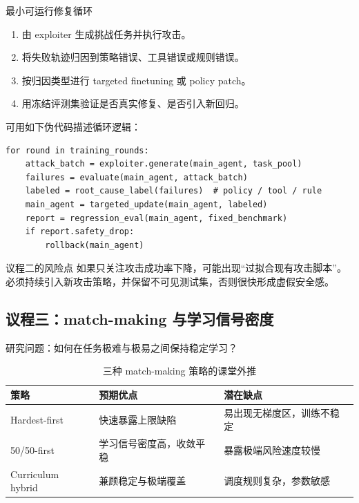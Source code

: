 \documentclass[a4paper]{article}
\begin{document}
\begin{importantbox}{最小可运行修复循环}
\begin{enumerate}
    \item 由 exploiter 生成挑战任务并执行攻击。
    \item 将失败轨迹归因到策略错误、工具错误或规则错误。
    \item 按归因类型进行 targeted finetuning 或 policy patch。
    \item 用冻结评测集验证是否真实修复、是否引入新回归。
\end{enumerate}
\end{importantbox}

可用如下伪代码描述循环逻辑：
\begin{lstlisting}[caption={Auto-Exploit to Auto-Repair 循环（示意）}]
for round in training_rounds:
    attack_batch = exploiter.generate(main_agent, task_pool)
    failures = evaluate(main_agent, attack_batch)
    labeled = root_cause_label(failures)  # policy / tool / rule
    main_agent = targeted_update(main_agent, labeled)
    report = regression_eval(main_agent, fixed_benchmark)
    if report.safety_drop:
        rollback(main_agent)
\end{lstlisting}

\begin{warningbox}{议程二的风险点}
如果只关注攻击成功率下降，可能出现``过拟合现有攻击脚本''。必须持续引入新攻击策略，并保留不可见测试集，否则很快形成虚假安全感。
\end{warningbox}

\subsection{议程三：match-making 与学习信号密度}
研究问题：如何在任务极难与极易之间保持稳定学习？

\begin{table}[H]
\centering
\caption{三种 match-making 策略的课堂外推}
\begin{tabular}{p{3.0cm}p{4.0cm}p{5.6cm}}
\toprule
策略 & 预期优点 & 潜在缺点 \\
\midrule
Hardest-first & 快速暴露上限缺陷 & 易出现无梯度区，训练不稳定 \\
50/50-first & 学习信号密度高，收敛平稳 & 暴露极端风险速度较慢 \\
Curriculum hybrid & 兼顾稳定与极端覆盖 & 调度规则复杂，参数敏感 \\
\bottomrule
\end{tabular}
\end{table}
\end{document}
